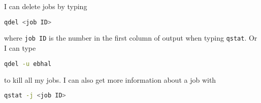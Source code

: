 I can delete jobs by typing

\begin{lstlisting}[belowskip=-0.7cm, language=sh, numbers=none]
qdel <job ID>
\end{lstlisting}

where \verb!job ID! is the number in the first column of output when typing \verb!qstat!. Or I can type

\begin{lstlisting}[belowskip=-0.7cm, language=sh, numbers=none]
qdel -u ebhal
\end{lstlisting}

to kill all my jobs. I can also get more information about a job with

\begin{lstlisting}[belowskip=-0.7cm, language=sh, numbers=none]
qstat -j <job ID>
\end{lstlisting}
